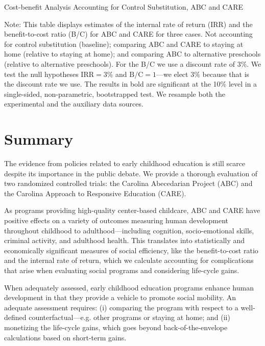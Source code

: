 \begin{table}[H]
\begin{threeparttable}
\caption{Cost-benefit Analysis Accounting for Control Substitution, ABC and CARE}
\label{table:cbacs}
\centering

\begin{tablenotes}
\item Note: This table displays estimates of the internal rate of return (IRR) and the benefit-to-cost ratio (B/C) for ABC and CARE for three cases. Not accounting for control substitution (baseline); comparing ABC and CARE to staying at home (relative to staying at home); and comparing ABC to alternative preschools (relative to alternative preschools). For the B/C we use a discount rate of $3\%$. We test the null hypotheses $\text{IRR} = 3\%$ and $\text{B/C} = 1$---we elect $3\%$ because that is the discount rate we use. The results in bold are significant at the 10\% level in a single-sided, non-parametric, bootstrapped test. We resample both the experimental and the auxiliary data sources.
\end{tablenotes}
\end{threeparttable}
\end{table}


\section{Summary} \label{section:conclusion}

The evidence from policies related to early childhood education is still scarce despite its importance in the public debate. We provide a thorough evaluation of two randomized controlled trials: the Carolina Abecedarian Project (ABC) and the Carolina Approach to Responsive Education (CARE).

As programs providing high-quality center-based childcare, ABC and CARE have positive effects on a variety of outcomes measuring human development throughout childhood to adulthood---including cognition, socio-emotional skills, criminal activity, and adulthood health. This translates into statistically and economically significant measures of social efficiency, like the benefit-to-cost ratio and the internal rate of return, which we calculate accounting for complications that arise when evaluating social programs and considering life-cycle gains.

When adequately assessed, early childhood education programs enhance human development in that they provide a vehicle to promote social mobility. An adequate assessment requires: (i) comparing the program with respect to a well-defined counterfactual---e.g. other programs or staying at home; and (ii) monetizing the life-cycle gains, which goes beyond back-of-the-envelope calculations based on short-term gains.

\clearpage

\singlespace



 